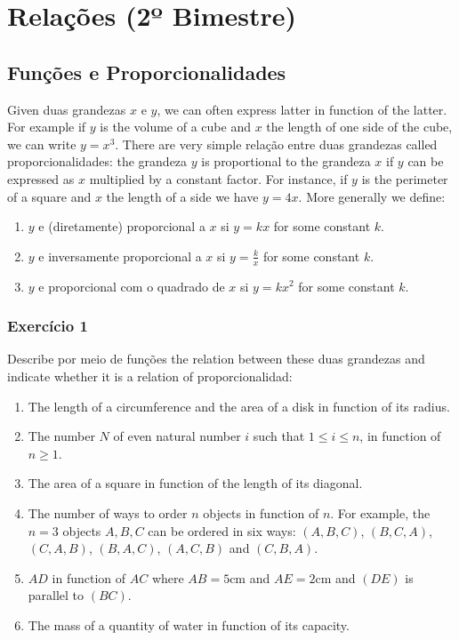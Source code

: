 \chapter{Relações (2º Bimestre)}

\section{Funções e Proporcionalidades}

Given duas grandezas $x$ e $y$, we can often express latter in function of the
latter. For example if $y$ is the volume of a cube and $x$ the length of one
side of the cube, we can write $y = x^3$. There are very simple
relação entre duas grandezas called proporcionalidades: the grandeza $y$ is
proportional to the grandeza $x$ if $y$ can be expressed as $x$ multiplied
by a constant factor. For instance, if $y$ is the perimeter of a square and
$x$ the length of a side we have $y = 4x$. More generally we define:

\begin{enumerate}
\item $y$ e (diretamente) proporcional a $x$ si
  $y = {k x}$ for some constant $k$.
\item $y$ e inversamente proporcional a $x$ si $y = \frac{k}{x}$
  for some constant $k$.
\item $y$ e proporcional com o quadrado de $x$ si $y = {k x^2}$ for some
  constant $k$.
\end{enumerate}

\subsection*{Exercício 1}

Describe por meio de funções the relation between these duas grandezas and
indicate whether it is a relation of proporcionalidad:

\begin{enumerate}
\item The length of a circumference
  and the area of a disk in function of its radius.
\item The number $N$ of even natural number $i$ such that $1 \leq i \leq n$,
  in function of $n \geq 1$.
\item The area of a square in function of the length of its diagonal.
\item The number of ways to order $n$ objects in function of $n$.
  For example, the $n=3$ objects $A,B,C$ can be ordered in six ways:
  $(A,B,C)$, $(B,C,A)$, $(C,A,B)$, $(B,A,C)$, $(A,C,B)$ and $(C,B,A)$.
\item $AD$ in function of $AC$ where $AB = 5\text{cm}$ and
  $AE = 2\text{cm}$ and $(DE)$ is parallel to $(BC)$.
  \begin{center}
\end{center}
\item The mass of a quantity of water in function of its capacity.
\end{enumerate}

